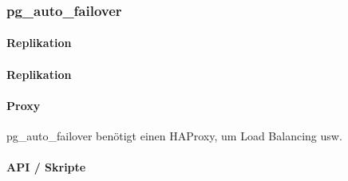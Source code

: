 
\subsubsection{pg\_auto\_failover}
\begin{flushleft}
    \paragraph{Replikation}
\end{flushleft}
\begin{flushleft}
    \paragraph{Replikation}
\end{flushleft}
\begin{flushleft}
    \paragraph{Proxy}
    pg\_auto\_failover benötigt einen \Gls{HAProxy}, um Load Balancing usw. \cite{VYXTI7BS}
\end{flushleft}
\begin{flushleft}
    \paragraph{API / Skripte}

\end{flushleft}

